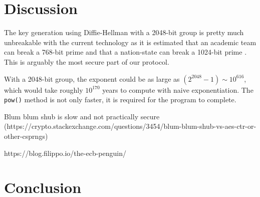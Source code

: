 \documentclass{article}
\begin{document}
\section{Discussion}

The key generation using Diffie-Hellman with a 2048-bit group is pretty much unbreakable with the current technology as it is estimated that an academic team can break a 768-bit prime and that a nation-state can break a 1024-bit prime \cite{weakdh15}. This is arguably the most secure part of our protocol. 

With a 2048-bit group, the exponent could be as large as $(2^{2048}-1) \sim 10^{616}$, which would take roughly $10^{170}$ years to compute with naive exponentiation. The \verb+pow()+ method is not only faster, it is required for the program to complete.


Blum blum shub is slow and not practically secure (https://crypto.stackexchange.com/questions/3454/blum-blum-shub-vs-aes-ctr-or-other-csprngs)

https://blog.filippo.io/the-ecb-penguin/

\section{Conclusion}





\end{document}
